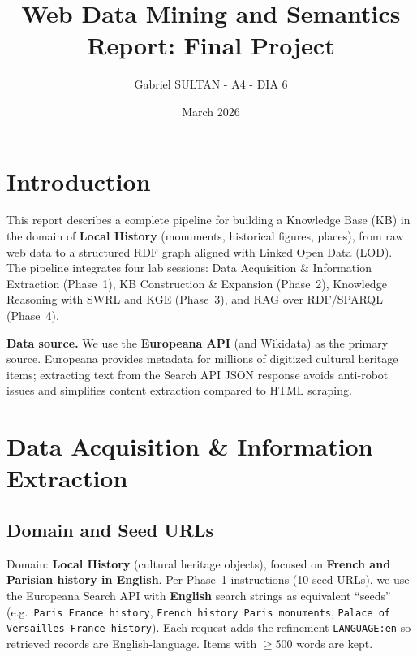 \documentclass[11pt,a4paper]{article}
\title{Web Data Mining and Semantics\\Report: Final Project}
\author{Gabriel SULTAN - A4 - DIA 6}
\date{March 2026}
\begin{document}
\maketitle

\section{Introduction}

This report describes a complete pipeline for building a Knowledge Base (KB) in the domain of \textbf{Local History} (monuments, historical figures, places), from raw web data to a structured RDF graph aligned with Linked Open Data (LOD). The pipeline integrates four lab sessions: Data Acquisition \& Information Extraction (Phase~1), KB Construction \& Expansion (Phase~2), Knowledge Reasoning with SWRL and KGE (Phase~3), and RAG over RDF/SPARQL (Phase~4).

\textbf{Data source.} We use the \textbf{Europeana API} (and Wikidata) as the primary source. Europeana provides metadata for millions of digitized cultural heritage items; extracting text from the Search API JSON response avoids anti-robot issues and simplifies content extraction compared to HTML scraping.


\section{Data Acquisition \& Information Extraction}

\subsection{Domain and Seed URLs}

Domain: \textbf{Local History} (cultural heritage objects), focused on \textbf{French and Parisian history in English}. Per Phase~1 instructions (10 seed URLs), we use the Europeana Search API with \textbf{English} search strings as equivalent ``seeds'' (e.g.\ \texttt{Paris France history}, \texttt{French history Paris monuments}, \texttt{Palace of Versailles France history}). Each request adds the refinement \texttt{LANGUAGE:en} so retrieved records are English-language. Items with $\geq$500 words are kept.
\end{document}
